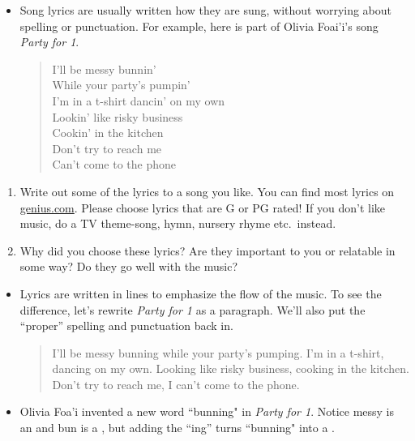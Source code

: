 \documentclass[12pt]{article}
\newcounter{exercisenum}
\newenvironment{exercises}{%
  \begin{tcolorbox}[colback=white,colframe=black,arc=0pt,breakable]
  \begin{enumerate}[label=\arabic*),leftmargin=1cm,resume=exercises]
  \setcounter{enumi}{\value{exercisenum}}
}{%
  \setcounter{exercisenum}{\value{enumi}}
  \end{enumerate}
  \end{tcolorbox}
}
\begin{document}
\thispagestyle{firstpage}

\begin{itemize}
\item
Song lyrics are usually written how they are sung, without worrying about spelling or punctuation. For example, here is part of Olivia Foai'i's song \textit{Party for 1}.
\begin{quotation}
\noindent I'll be messy bunnin' \\
While your party's pumpin' \\
I'm in a t-shirt dancin' on my own \\
Lookin' like risky business \\
Cookin' in the kitchen \\
Don't try to reach me \\
Can't come to the phone
\end{quotation}
\end{itemize}

\begin{exercises}
\item    
Write out some of the lyrics to a song you like. You can find most lyrics on \url{genius.com}. Please choose lyrics that are G or PG rated! \label{Ex:lyrics} If you don't like music, do a TV theme-song, hymn, nursery rhyme etc.~instead.
\item
Why did you choose these lyrics? Are they important to you or relatable in some way? Do they go well with the music?
\end{exercises}

\begin{itemize}
\item
Lyrics are written in lines to emphasize the flow of the music. To see the difference, let's rewrite \textit{Party for 1} as a paragraph. We'll also put the ``proper'' spelling and punctuation back in. 
\begin{quotation}
\noindent I'll be messy bunning while your party's pumping. I'm in a t-shirt, dancing on my own. Looking like risky business, cooking in the kitchen. Don't try to reach me, I can't come to the phone.
\end{quotation}
\item
Olivia Foa'i invented a new word ``bunning" in \textit{Party for 1}. Notice messy is an  and bun is a , but adding the ``ing'' turns ``bunning" into a .
\end{itemize}
\end{document}
